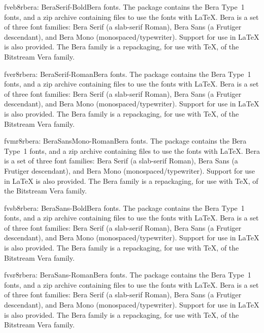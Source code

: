 \documentclass{ddltxtyp}
\begin{document}
\begin{package}{fveb8r}{bera: BeraSerif-Bold}{Bera fonts.}
The package contains the Bera Type~1 fonts, and a zip archive
containing files to use the fonts with {\LaTeX}. Bera is a set of
three font families: Bera Serif (a slab-serif Roman), Bera Sans
(a Frutiger descendant), and Bera Mono (monospaced/typewriter).
Support for use in {\LaTeX} is also provided. The Bera family is a
repackaging, for use with {\TeX}, of the Bitstream Vera family.
\end{package}
\begin{package}{fver8r}{bera: BeraSerif-Roman}{Bera fonts.}
The package contains the Bera Type~1 fonts, and a zip archive
containing files to use the fonts with {\LaTeX}. Bera is a set of
three font families: Bera Serif (a slab-serif Roman), Bera Sans
(a Frutiger descendant), and Bera Mono (monospaced/typewriter).
Support for use in {\LaTeX} is also provided. The Bera family is a
repackaging, for use with {\TeX}, of the Bitstream Vera family.
\end{package}
\begin{package}{fvmr8r}{bera: BeraSansMono-Roman}{Bera fonts.}
The package contains the Bera Type~1 fonts, and a zip archive
containing files to use the fonts with {\LaTeX}. Bera is a set of
three font families: Bera Serif (a slab-serif Roman), Bera Sans
(a Frutiger descendant), and Bera Mono (monospaced/typewriter).
Support for use in {\LaTeX} is also provided. The Bera family is a
repackaging, for use with {\TeX}, of the Bitstream Vera family.
\end{package}
\begin{package}{fvsb8r}{bera: BeraSans-Bold}{Bera fonts.}
The package contains the Bera Type~1 fonts, and a zip archive
containing files to use the fonts with {\LaTeX}. Bera is a set of
three font families: Bera Serif (a slab-serif Roman), Bera Sans
(a Frutiger descendant), and Bera Mono (monospaced/typewriter).
Support for use in {\LaTeX} is also provided. The Bera family is a
repackaging, for use with {\TeX}, of the Bitstream Vera family.
\end{package}
\begin{package}{fvsr8r}{bera: BeraSans-Roman}{Bera fonts.}
The package contains the Bera Type~1 fonts, and a zip archive
containing files to use the fonts with {\LaTeX}. Bera is a set of
three font families: Bera Serif (a slab-serif Roman), Bera Sans
(a Frutiger descendant), and Bera Mono (monospaced/typewriter).
Support for use in {\LaTeX} is also provided. The Bera family is a
repackaging, for use with {\TeX}, of the Bitstream Vera family.
\end{package}
\end{document}
